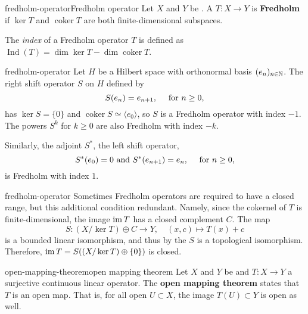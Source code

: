 \begin{topic}{fredholm-operator}{Fredholm operator}
    Let $X$ and $Y$ be . A  $T : X \to Y$ is \textbf{Fredholm} if $\ker T$ and $\operatorname{coker} T$ are both finite-dimensional subspaces.
    
    The \textit{index} of a Fredholm operator $T$ is defined as $\operatorname{Ind}(T) = \dim \ker T - \dim \operatorname{coker} T$.
\end{topic}

\begin{example}{fredholm-operator}
    Let $H$ be a Hilbert space with orthonormal basis $(e_n)_{n \in \mathbb{N}}$. The right shift operator $S$ on $H$ defined by
    \[ S(e_n) = e_{n + 1}, \quad \textup{ for } n \ge 0 , \]
    has $\ker S = \{ 0 \}$ and $\operatorname{coker} S \simeq \langle e_0 \rangle$, so $S$ is a Fredholm operator with index $-1$. The powers $S^k$ for $k \ge 0$ are also Fredholm with index $-k$.
    
    Similarly, the adjoint $S^*$, the left shift operator,
    \[ S^*(e_0) = 0 \text{ and } S^*(e_{n + 1}) = e_n, \quad \textup { for } n \ge 0 , \]
    is Fredholm with index $1$.
\end{example}

\begin{example}{fredholm-operator}
    Sometimes Fredholm operators are required to have a closed range, but this additional condition redundant. Namely, since the cokernel of $T$ is finite-dimensional, the image $\operatorname{im} T$ has a closed complement $C$. The map
    \[ S : (X / \ker T) \oplus C \to Y, \quad (x, c) \mapsto T(x) + c \]
    is a bounded linear isomorphism, and thus by the  $S$ is a topological isomorphism. Therefore, $\operatorname{im} T = S((X / \ker T) \oplus \{ 0 \})$ is closed.
\end{example}

\begin{topic}{open-mapping-theorem}{open mapping theorem}
    Let $X$ and $Y$ be  and $T : X \to Y$ a surjective continuous linear operator. The \textbf{open mapping theorem} states that $T$ is an open map. That is, for all open $U \subset X$, the image  $T(U) \subset Y$ is open as well.
\end{topic}
